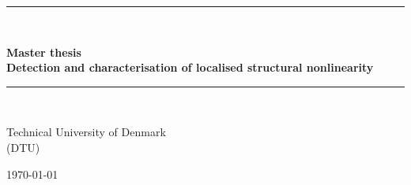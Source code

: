 
{\parindent0pt
  \newcommand{\HRule}{\rule{\textwidth}{1mm}}

  \HRule\\[1cm]
  \begin{center}
    \Huge{\bfseries
      Master thesis\\[0.7cm]
      \large{Detection and characterisation of localised structural nonlinearity}\\[1cm]
      }
  \end{center}
  \HRule\\[1cm]
  \begin{center}
    Technical University of Denmark\\ (DTU)
  \end{center}
}

\begin{flushleft}
  \today
\end{flushleft}


